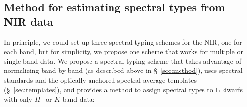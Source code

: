 \documentclass[12pt,preprint]{aastex}
\begin{document}
\subsection{Method for estimating spectral types from NIR data}

In principle, we could set up three spectral typing schemes for the NIR, one for each band, but for simplicity, we propose one scheme that works for multiple or single band data.
We propose a spectral typing scheme that takes advantage of normalizing band-by-band (as described above in \S~\ref{sec:method}), uses spectral standards and the optically-anchored spectral average templates (\S~\ref{sec:templates}), and provides a method to assign spectral types to L~dwarfs with only $H$-~or $K$-band data:
\end{document}
